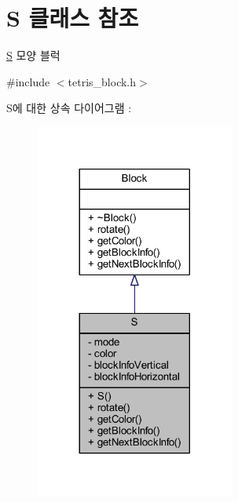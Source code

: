 \hypertarget{class_s}{}\section{S 클래스 참조}
\label{class_s}


\mbox{\hyperlink{class_s}{S}} 모양 블럭  




{\ttfamily \#include $<$tetris\+\_\+block.\+h$>$}



S에 대한 상속 다이어그램 \+: 
\nopagebreak
\begin{figure}[H]
\begin{center}
\leavevmode
\includegraphics[width=185pt]{class_s__inherit__graph}
\end{center}
\end{figure}


